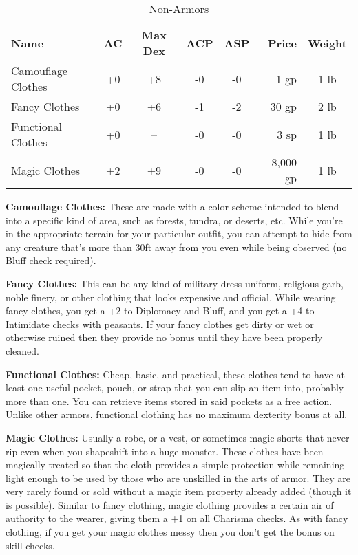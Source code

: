 \begin{table}[htb]
\caption{Non-Armors}
\centering
\begin{tabular}{l *{4}{c} r c}
\textbf{Name} & \textbf{AC} & \textbf{Max Dex} & \textbf{ACP} & \textbf{ASP} & \textbf{Price} & \textbf{Weight}\\
Camouflage Clothes & +0 & +8 & -0 & -0 & 1 gp & 1 lb\\
Fancy Clothes & +0 & +6 & -1 & -2 & 30 gp & 2 lb\\
Functional Clothes & +0 & -- & -0 & -0 & 3 sp & 1 lb\\
Magic Clothes & +2 & +9 & -0 & -0 & 8,000 gp & 1 lb\\
\end{tabular}
\end{table}

\textbf{Camouflage Clothes:} These are made with a color scheme intended to blend into a specific kind of area, such as forests, tundra, or deserts, etc. While you're in the appropriate terrain for your particular outfit, you can attempt to hide from any creature that's more than 30ft away from you even while being observed (no Bluff check required).

\textbf{Fancy Clothes:} This can be any kind of military dress uniform, religious garb, noble finery, or other clothing that looks expensive and official. While wearing fancy clothes, you get a +2 to Diplomacy and Bluff, and you get a +4 to Intimidate checks with peasants. If your fancy clothes get dirty or wet or otherwise ruined then they provide no bonus until they have been properly cleaned.

\textbf{Functional Clothes:} Cheap, basic, and practical, these clothes tend to have at least one useful pocket, pouch, or strap that you can slip an item into, probably more than one. You can retrieve items stored in said pockets as a free action. Unlike other armors, functional clothing has no maximum dexterity bonus at all.

\textbf{Magic Clothes:} Usually a robe, or a vest, or sometimes magic shorts that never rip even when you shapeshift into a huge monster. These clothes have been magically treated so that the cloth provides a simple protection while remaining light enough to be used by those who are unskilled in the arts of armor. They are very rarely found or sold without a magic item property already added (though it is possible). Similar to fancy clothing, magic clothing provides a certain air of authority to the wearer, giving them a +1 on all Charisma checks. As with fancy clothing, if you get your magic clothes messy then you don't get the bonus on skill checks.

